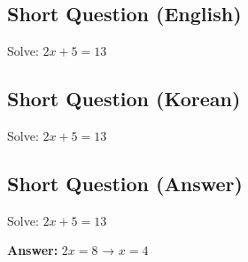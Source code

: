 \cleardoublepage
\subsection*{Short Question (English)}
Solve: $2x + 5 = 13$


\newpage
\subsection*{Short Question (Korean)}
Solve: $2x + 5 = 13$


\newpage
\subsection*{Short Question (Answer)}
Solve: $2x + 5 = 13$

\textbf{Answer:} $2x = 8$ → $x = 4$
